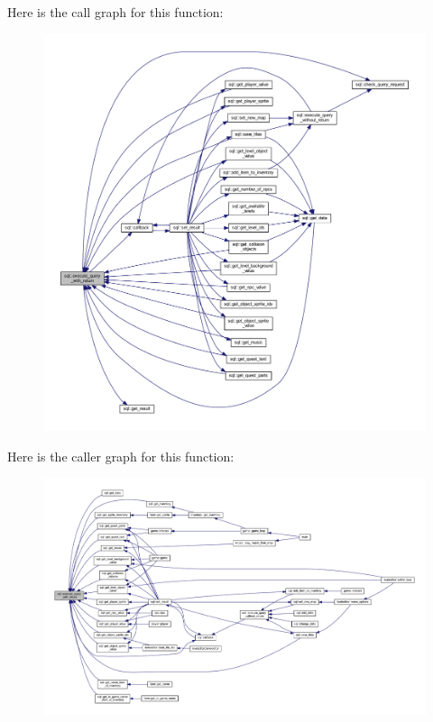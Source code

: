 Here is the call graph for this function\+:
\nopagebreak
\begin{figure}[H]
\begin{center}
\leavevmode
\includegraphics[width=350pt]{classsql_a53dd323de395c13534e63a3482190777_cgraph}
\end{center}
\end{figure}
Here is the caller graph for this function\+:
\nopagebreak
\begin{figure}[H]
\begin{center}
\leavevmode
\includegraphics[width=350pt]{classsql_a53dd323de395c13534e63a3482190777_icgraph}
\end{center}
\end{figure}
\mbox{\label{classsql_ac70e1da6d9e49f114bcf639fd1e6f86c}} 
